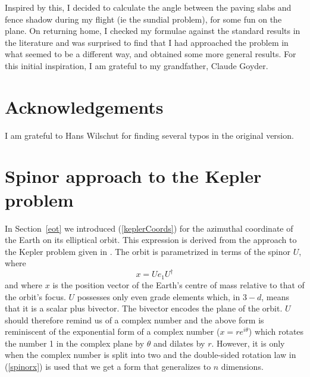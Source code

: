 \documentclass[12pt]{article}
\begin{document}
Inspired by this, I decided to calculate the angle between the paving slabs and fence shadow during my flight (ie the sundial problem), for some fun on the plane. On returning home, I checked my formulae against the standard results in the literature and was surprised to find that I had approached the problem in what seemed to be a different way, and obtained some more general results. For this initial inspiration, I am grateful to my grandfather, Claude Goyder.
%
\section*{Acknowledgements}
%
I am grateful to Hans Wilschut for finding several typos in the original version.
%
\clearpage
%
\appendix 
\section{Spinor approach to the Kepler problem} \label{kepler}
%
In Section~\ref{eot} we introduced (\ref{keplerCoords}) for the azimuthal coordinate of the Earth on its elliptical orbit. This expression is derived from the approach to the Kepler problem given in \cite{GAbook}. The orbit is parametrized in terms of the spinor $U$, where
%
\begin{equation} \label{spinorx}
x = U e_1 U^\dag
\end{equation}
%
and where $x$ is the position vector of the Earth's centre of mass relative to that of the orbit's focus. $U$ possesses only even grade elements which, in $3-d$, means that it is a scalar plus bivector. The bivector encodes the plane of the orbit. $U$ should therefore remind us of a complex number and the above form is reminiscent of the exponential form of a complex number ($x = re^{i\theta}$) which rotates the number 1 in the complex plane by $\theta$ and dilates by $r$. However, it is only when the complex number is split into two and the double-sided rotation law in (\ref{spinorx}) is used that we get a form that generalizes to $n$ dimensions.
\end{document}
